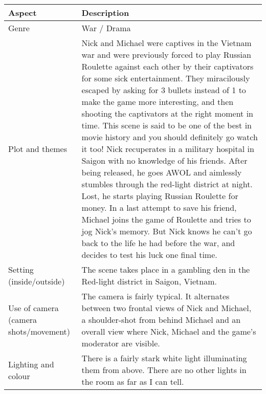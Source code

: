 \documentclass[notitlepage]{fhnwreport}
\begin{document}
\begin{center}
\begin{threeparttable}
	\begin{tabular}{p{4.2cm}p{11cm}}
		\toprule
		Aspect & Description \\
		\midrule
		Genre & 
War / Drama \\
		\midrule
		Plot and themes &
Nick and Michael were captives in the Vietnam war and were previously forced to play Russian Roulette against each other by their captivators for some sick entertainment. They miracilously escaped by asking for 3 bullets instead of 1 to make the game more interesting, and then shooting the captivators at the right moment in time. This scene is said to be one of the best in movie history and you should definitely go watch it too! Nick recuperates in a military hospital in Saigon with no knowledge of his friends. After being released, he goes AWOL and aimlessly stumbles through the red-light district at night. Lost, he starts playing Russian Roulette for money. In a last attempt to save his friend, Michael joins the game of Roulette and tries to jog Nick's memory. But Nick knows he can't go back to the life he had before the war, and decides to test his luck one final time. \\
		\midrule
		Setting (inside/outside) &
The scene takes place in a gambling den in the Red-light district in Saigon, Vietnam. \\
		\midrule
		Use of camera (camera shots/movement) & The camera is fairly typical. It alternates between two frontal views of Nick and Michael, a shoulder-shot from behind Michael and an overall view where Nick, Michael and the game's moderator are visible. \\
		\midrule
		Lighting and colour &
There is a fairly stark white light illuminating them from above. There are no other lights in the room as far as I can tell. \\
		\midrule
	\end{tabular}
\end{threeparttable}
\end{center}
\end{document}
